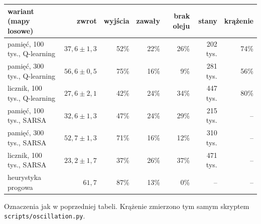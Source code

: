 \documentclass[11pt,a4paper]{article}
\begin{document}
\begin{center}
\small
\begin{tabular}{@{}lrrrrrr@{}}
\toprule
wariant (mapy losowe) & zwrot & wyjścia & zawały & brak oleju & stany & krążenie \\
\midrule
pamięć, 100 tys., Q-learning & $37{,}6\pm1{,}3$ & 52\% & 22\% & 26\% & 202 tys. & 74\% \\
pamięć, 300 tys., Q-learning & $56{,}6\pm0{,}5$ & 75\% & 16\% & 9\% & 281 tys. & 56\% \\
licznik, 100 tys., Q-learning & $27{,}6\pm2{,}1$ & 42\% & 24\% & 34\% & 447 tys. & 80\% \\
pamięć, 100 tys., SARSA & $32{,}6\pm1{,}3$ & 47\% & 24\% & 29\% & 215 tys. & -- \\
pamięć, 300 tys., SARSA & $52{,}7\pm1{,}3$ & 71\% & 16\% & 12\% & 310 tys. & -- \\
licznik, 100 tys., SARSA & $23{,}2\pm1{,}7$ & 37\% & 26\% & 37\% & 471 tys. & -- \\
\midrule
heurystyka progowa & $61{,}7$ & 87\% & 13\% & 0\% & -- & -- \\
\bottomrule
\end{tabular}
\end{center}
Oznaczenia jak w poprzedniej tabeli. Krążenie zmierzono tym samym skryptem
\texttt{scripts/\allowbreak oscillation.py}.
\end{document}
